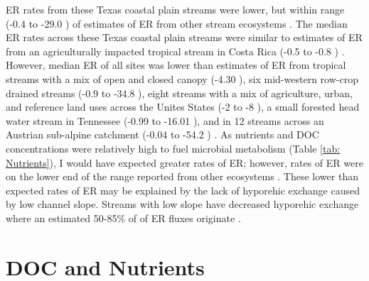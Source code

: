 ER rates from these Texas coastal plain streams were lower, but within range (-0.4 to -29.0 \unit{\goxy}) of estimates of ER from other stream ecosystems \cite{bernot_inter-regional_2010}. The median ER rates across these Texas coastal plain streams were similar to estimates of ER from an agriculturally impacted tropical stream in Costa Rica (-0.5 to -0.8 \unit{\goxy}) \cite{ortega-pieckAgriculturalInfluencesMagnitude2017}.
However, median ER of all sites was lower than estimates of ER from tropical streams with a mix of open and closed canopy (-4.30 \unit{\goxy}), six mid-western row-crop drained streams (-0.9 to -34.8 \unit{\goxy}), eight streams with a mix of agriculture, urban, and reference land uses across the Unites States (-2 to -8 \unit{\goxy}), a small forested head water stream in Tennessee (-0.99 to -16.01 \unit{\goxy}), and in 12 streams across an Austrian sub-alpine catchment (-0.04 to -54.2 \unit{\goxy}) \cite{marzolfEcosystemMetabolismTropical2021, bernot_inter-regional_2010, mulholland_inter-biome_2001, ulseth_climate-induced_2018, roberts_multiple_2007, griffithsAgriculturalLandUse2013}. As nutrients and DOC concentrations were relatively high to fuel microbial metabolism (Table \ref{tab: Nutrients}), I would have expected greater rates of ER; however, rates of ER were on the lower end of the range reported from other ecosystems \cite{bernot_inter-regional_2010, mulholland_inter-biome_2001, ulseth_climate-induced_2018, roberts_multiple_2007, griffithsAgriculturalLandUse2013}. These lower than expected rates of ER may be explained by the lack of hyporehic exchange caused by low channel slope. Streams with low slope have decreased hyporehic exchange where an estimated 50-85\% of of ER fluxes originate  \cite{stanfordEcosystemPerspectiveAlluvial1993, naegeliContributionHyporheicZone1997,fellowsWholeStreamMetabolism2001, mulhollandEvidenceThatHyporheic1997}.
 


\section{DOC and Nutrients}

